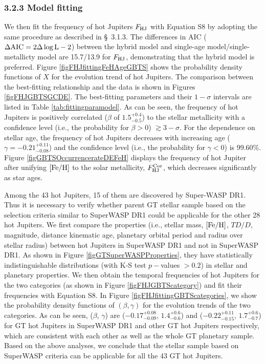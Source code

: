 \documentclass[twocolumn]{pnas-new}
\begin{document}
\subsubsection*{3.2.3 Model fitting} 
\label{sec.obs.GBTS.fitting}
We then fit the frequency of hot Jupiters $F_{\rm HJ}$ with Equation S8 by adopting the same procedure as described in \S~3.1.3.
The differences in AIC ($\rm \Delta AIC = 2 \Delta \log L - 2$) between the hybrid model and single-age model/single-metallicty model are 15.7/13.9 for $F_{\rm HJ}$, demonstrating that the hybrid model is preferred. 
Figure \ref{figFHJfittingFeHAgeGBTS} shows the probability density functions of $X$ for the evolution trend of hot Jupiters.
The comparison between the best-fitting relationship and
the data is shown in Figures \ref{figFHJGBTSGCDE}.
The best-fitting parameters and their $1-\sigma$ intervals are listed in Table \ref{tab:fittingparamodel}.
As can be seen, the frequency of hot Jupiters is positively correlated ($\beta$ of $1.5^{+0.4}_{-0.5}$) to the stellar metallicity with a confidence level (i.e., the probability for $\beta>0$) $\gtrsim 3-\sigma$.
For the dependence on stellar age, the frequency of hot Jupiters decreases with increasing age ($\gamma = -0.21^{+0.11}_{-0.08}$) and the confidence level (i.e., the probability for $\gamma<0$) is 99.60\%.
Figure \ref{figGBTSOccurrencerateDEFeH} displays the frequency of hot Jupiter after unifying $\rm [Fe/H]$ to the solar metallicity, $F^{\rm Cor}_{\rm HJ}$, which decreases significantly as star ages.

Among the 43 hot Jupiters, 15 of them are discovered by Super-WASP DR1.
Thus it is necessary to verify whether parent GT stellar sample based on the selection criteria similar to SuperWASP DR1 could be applicable for the other 28 hot Jupiters.
We first compare the properties (i.e., stellar mass, $\rm [Fe/H]$, $TD/D$, magnitude, distance kinematic age, planetary orbital period and radius over stellar radius) between hot Jupiters in SuperWASP DR1 and not in SuperWASP DR1.
As shown in Figure \ref{figGTSuperWASPProperties}, they have statistically indistinguishable distributions (with K-S test $p-$values $>0.2$) in stellar and planetary properties.
We then obtain the temporal frequencies of hot Jupiters for the two categories (as shown in Figure \ref{figFHJGBTScategory}) and fit their frequencies with Equation S8.
In Figure \ref{figFHJfittingGBTScategories}, we show the probability density functions of $(\beta, \gamma)$
for the evolution trends of the two categories.
As can be seen, ($\beta$, $\gamma$) are ($-0.17^{+0.08}_{-0.09}$, $1.4^{+0.6}_{-0.6}$) and ($-0.22^{+0.11}_{-0.15}$, $1.7^{+0.6}_{-0.7}$) for GT hot Jupiters in SuperWASP DR1 and other GT hot Jupiters respectively, which are consistent with each other as well as the whole GT planetary sample.
Based on the above analyses, we conclude that the stellar sample based on SuperWASP criteria can be applicable for all the 43 GT hot Jupiters.
\end{document}
